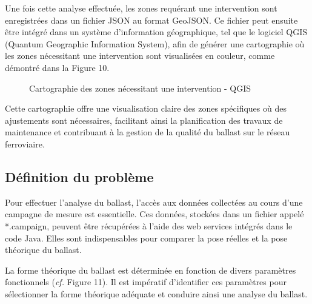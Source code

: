 \noindent Une fois cette analyse effectuée, les zones requérant une intervention sont enregistrées dans un fichier JSON au format GeoJSON. Ce fichier peut ensuite être intégré dans un système d'information géographique, tel que le logiciel QGIS (Quantum Geographic Information System), afin de générer une cartographie où les zones nécessitant une intervention sont visualisées en couleur, comme démontré dans la Figure 10.\\
\begin{figure}[H]
            \centering
            \caption{Cartographie des zones nécessitant une intervention - QGIS } 
        \end{figure}

Cette cartographie offre une visualisation claire des zones spécifiques où des ajustements sont nécessaires, facilitant ainsi la planification des travaux de maintenance et contribuant à la gestion de la qualité du ballast sur le réseau ferroviaire.


\subsection{Définition du problème}


Pour effectuer l'analyse du ballast, l'accès aux données collectées au cours d'une campagne de mesure est essentielle. Ces données, stockées dans un fichier appelé *.campaign, peuvent être récupérées à l'aide des web services intégrés dans le code Java. Elles sont indispensables pour comparer la pose réelles et la pose théorique du ballast.\\
\newpage

\noindent La forme théorique du ballast est déterminée en fonction de divers paramètres fonctionnels (\textit{cf.} Figure 11). Il est impératif d'identifier ces paramètres pour sélectionner la forme théorique adéquate et conduire ainsi une analyse du ballast.\\

